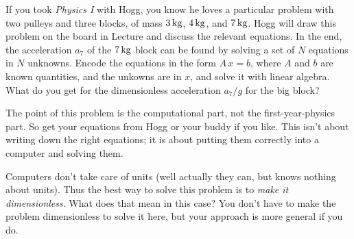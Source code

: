 \documentclass[12pt]{article}
\begin{document}
\begin{problem}
  If you took \textsl{Physics I} with Hogg, you know he loves a particular problem with two pulleys and three blocks, of mass $3\,\mathrm{kg}$, $4\,\mathrm{kg}$, and $7\,\mathrm{kg}$.
  Hogg will draw this problem on the board in Lecture and discuss the relevant equations.
  In the end, the acceleration $a_7$ of the $7\,\mathrm{kg}$ block can be found by solving a set of $N$ equations in $N$ unknowns.
  Encode the equations in the form $A\,x=b$, where $A$ and $b$ are known quantities, and the unkowns are in $x$, and solve it with  linear algebra.
  What do you get for the dimensionless acceleration $a_7 / g$ for the big block?
\end{problem}

\begin{note}
  The point of this problem is the computational part, not the first-year-physics part.
  So get your equations from Hogg or your buddy if you like.
  This isn't about writing down the right equations; it is about putting them correctly into a computer and solving them.
\end{note}

\begin{note}
  Computers don't take care of units (well actually they can, but  knows nothing about units).
  Thus the best way to solve this problem is to \emph{make it dimensionless}.
  What does that mean in this case?
  You don't have to make the problem dimensionless to solve it here, but your approach is more general if you do.
\end{note}
\end{document}
